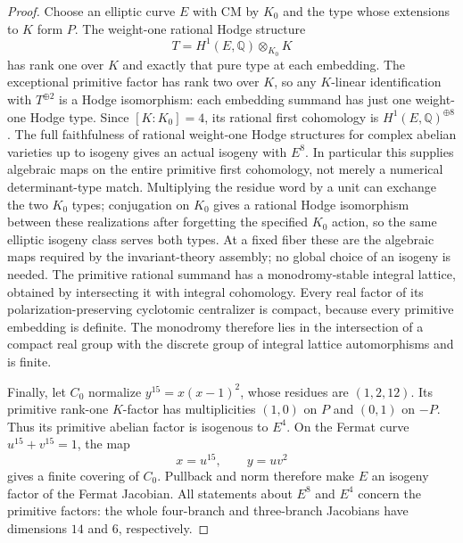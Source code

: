 \documentclass[11pt]{article}
\theoremstyle{definition}
\begin{document}
\begin{proof}
Choose an elliptic curve $E$ with CM by $K_0$ and the type whose
extensions to $K$ form $P$. The weight-one rational Hodge structure
\[
 T=H^1(E,\mathbb Q)\otimes_{K_0}K
\]
has rank one over $K$ and exactly that pure type at each embedding.
The exceptional primitive factor has rank two over $K$, so any
$K$-linear identification with $T^{\oplus2}$ is a Hodge isomorphism:
each embedding summand has just one weight-one Hodge type.
Since $[K:K_0]=4$, its rational first cohomology is
$H^1(E,\mathbb Q)^{\oplus8}$. The full faithfulness of rational
weight-one Hodge structures for complex abelian varieties up to
isogeny gives an actual isogeny with $E^8$.
In particular this supplies algebraic maps on the entire primitive
first cohomology, not merely a numerical determinant-type match.
Multiplying the residue word by a unit can exchange the two $K_0$
types; conjugation on $K_0$ gives a rational Hodge isomorphism between
these realizations after forgetting the specified $K_0$ action, so
the same elliptic isogeny class serves both types.
At a fixed fiber these are the algebraic maps required
by the invariant-theory assembly; no global choice of an isogeny is
needed. The primitive rational summand has a monodromy-stable integral
lattice, obtained by intersecting it with integral cohomology. Every
real factor of its polarization-preserving cyclotomic centralizer is
compact, because every primitive embedding is definite. The monodromy
therefore lies in the intersection of a compact real group with the
discrete group of integral lattice automorphisms and is finite.

Finally, let $C_0$ normalize $y^{15}=x(x-1)^2$, whose residues are
$(1,2,12)$. Its primitive rank-one $K$-factor has multiplicities
$(1,0)$ on $P$ and $(0,1)$ on $-P$. Thus its primitive abelian factor
is isogenous to $E^4$. On the Fermat curve $u^{15}+v^{15}=1$, the map
\[
 x=u^{15},\qquad y=uv^2
\]
gives a finite covering of $C_0$. Pullback and norm therefore make
$E$ an isogeny factor of the Fermat Jacobian.
All statements about $E^8$ and $E^4$ concern the primitive factors:
the whole four-branch and three-branch Jacobians have dimensions
$14$ and $6$, respectively.
\end{proof}
\end{document}
